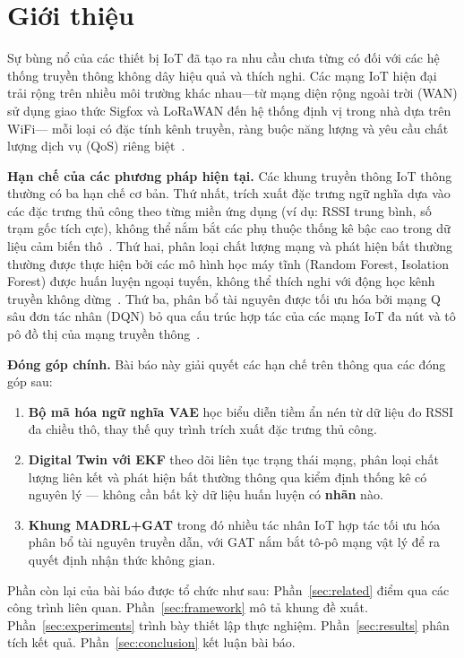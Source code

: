 \documentclass[conference]{IEEEtran}
\begin{document}
\section{Giới thiệu}
\label{sec:intro}

Sự bùng nổ của các thiết bị IoT đã tạo ra nhu cầu chưa từng có
đối với các hệ thống truyền thông không dây hiệu quả và thích
nghi. Các mạng IoT hiện đại trải rộng trên nhiều môi trường
khác nhau—từ mạng diện rộng ngoài trời (WAN) sử dụng giao thức
Sigfox và LoRaWAN đến hệ thống định vị trong nhà dựa trên WiFi—
mỗi loại có đặc tính kênh truyền, ràng buộc năng lượng và yêu
cầu chất lượng dịch vụ (QoS) riêng biệt~\cite{ref_iot_survey}.

\textbf{Hạn chế của các phương pháp hiện tại.}
Các khung truyền thông IoT thông thường có ba hạn chế cơ bản.
Thứ nhất, trích xuất đặc trưng ngữ nghĩa dựa vào các đặc trưng
thủ công theo từng miền ứng dụng (ví dụ: RSSI trung bình, số
trạm gốc tích cực), không thể nắm bắt các phụ thuộc thống kê
bậc cao trong dữ liệu cảm biến thô~\cite{ref_semantic}. Thứ hai,
phân loại chất lượng mạng và phát hiện bất thường thường được
thực hiện bởi các mô hình học máy tĩnh (Random Forest, Isolation
Forest) được huấn luyện ngoại tuyến, không thể thích nghi với
động học kênh truyền không dừng~\cite{ref_rf_iot}. Thứ ba,
phân bổ tài nguyên được tối ưu hóa bởi mạng Q sâu đơn tác nhân
(DQN) bỏ qua cấu trúc hợp tác của các mạng IoT đa nút và tô pô
đồ thị của mạng truyền thông~\cite{ref_dqn_iot}.

\textbf{Đóng góp chính.}
Bài báo này giải quyết các hạn chế trên thông qua các đóng góp sau:
\begin{enumerate}
  \item \textbf{Bộ mã hóa ngữ nghĩa VAE} học biểu diễn tiềm ẩn
        nén từ dữ liệu đo RSSI đa chiều thô, thay thế quy trình
        trích xuất đặc trưng thủ công.
  \item \textbf{Digital Twin với EKF} theo dõi liên tục trạng
        thái mạng, phân loại chất lượng liên kết và phát hiện bất
        thường thông qua kiểm định thống kê có nguyên lý --- không cần
        bất kỳ dữ liệu huấn luyện có \textbf{nhãn} nào.
  \item \textbf{Khung MADRL+GAT} trong đó nhiều tác nhân \mbox{IoT} hợp
        tác tối ưu hóa phân bổ tài nguyên truyền dẫn, với GAT nắm
        bắt tô-pô mạng vật lý để ra quyết định nhận thức không gian.
\end{enumerate}

Phần còn lại của bài báo được tổ chức như sau:
Phần~\ref{sec:related} điểm qua các công trình liên quan.
Phần~\ref{sec:framework} mô tả khung đề xuất.
Phần~\ref{sec:experiments} trình bày thiết lập thực nghiệm.
Phần~\ref{sec:results} phân tích kết quả.
Phần~\ref{sec:conclusion} kết luận bài báo.
\end{document}
